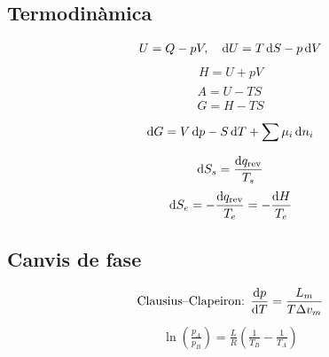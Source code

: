 \section{\mytitle}
\subsection{Termodinàmica}
\begin{align}
    U = Q - pV, \quad \mathrm{d} U = T\mathop{}\!\mathrm{d} S - p\mathop{}\!\mathrm{d} V
\end{align}
\begin{align}
    H = U + pV
\end{align}
\begin{align}
    \begin{aligned}
        A = U - TS \\
        G = H - TS
    \end{aligned}
\end{align}
\begin{align}
    \mathrm{d} G = V\mathop{}\!\mathrm{d} p - S \mathop{}\!\mathrm{d} T + \sum \mu_{i} \mathop{}\!\mathrm{d} n_{i}
\end{align}

\begin{align}
    \mathrm{d} S_s = \frac{\mathrm{d} q_{\text{rev}}}{T_s}
\end{align}
\begin{align}
    \mathrm{d} S_e = -\frac{\mathrm{d} q_{\text{rev}}}{T_e} = -\frac{\mathrm{d} H}{T_e}
\end{align}
\subsection{Canvis de fase}
\begin{align}
    \text{Clausius--Clapeiron: } \frac{\mathrm{d} p}{\mathrm{d} T} = \frac{L_{m}}{T \Delta v_{m}}
\end{align}
\begin{align}
    \ln \left( \frac{p_A}{p_B} \right) = \frac{L}{R} \left( \frac{1}{T_B} - \frac{1}{T_A} \right)
\end{align}
